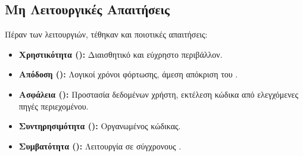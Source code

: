 \subsection{Μη Λειτουργικές Απαιτήσεις}
\label{sec:mi_leitourgikes_apaitiseis}
Πέραν των λειτουργιών, τέθηκαν και ποιοτικές απαιτήσεις:
\begin{itemize}[leftmargin=*, noitemsep]
    \item \textbf{Χρηστικότητα ():} Διαισθητικό και εύχρηστο περιβάλλον.
    \item \textbf{Απόδοση ():} Λογικοί χρόνοι φόρτωσης, άμεση απόκριση του .
    \item \textbf{Ασφάλεια ():} Προστασία δεδομένων χρήστη,  εκτέλεση κώδικα από ελεγχόμενες πηγές περιεχομένου.
    \item \textbf{Συντηρησιμότητα ():} Οργανωμένος κώδικας.
    \item \textbf{Συμβατότητα ():} Λειτουργία σε σύγχρονους .
\end{itemize}